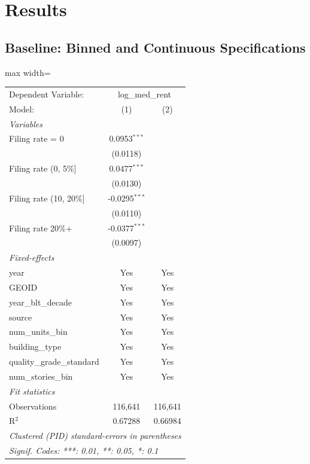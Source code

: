 \documentclass[
  11pt,
]{article}
\begin{document}
\section{Results}\label{results}

\subsection{Baseline: Binned and Continuous
Specifications}\label{baseline-binned-and-continuous-specifications}

\begin{adjustbox}{max width=\textwidth}
\begingroup
\centering
\begin{tabular}{lcc}
   \tabularnewline \midrule \midrule
   Dependent Variable: & \multicolumn{2}{c}{log\_med\_rent}\\
   Model:                     & (1)             & (2)\\  
   \midrule
   \emph{Variables}\\
   Filing rate = 0            & 0.0953$^{***}$  &   \\   
                              & (0.0118)        &   \\   
   Filing rate (0, 5\%]       & 0.0477$^{***}$  &   \\   
                              & (0.0130)        &   \\   
   Filing rate (10, 20\%]     & -0.0295$^{***}$ &   \\   
                              & (0.0110)        &   \\   
   Filing rate 20\%+          & -0.0377$^{***}$ &   \\   
                              & (0.0097)        &   \\   
   \midrule
   \emph{Fixed-effects}\\
   year                       & Yes             & Yes\\  
   GEOID                      & Yes             & Yes\\  
   year\_blt\_decade          & Yes             & Yes\\  
   source                     & Yes             & Yes\\  
   num\_units\_bin            & Yes             & Yes\\  
   building\_type             & Yes             & Yes\\  
   quality\_grade\_standard   & Yes             & Yes\\  
   num\_stories\_bin          & Yes             & Yes\\  
   \midrule
   \emph{Fit statistics}\\
   Observations               & 116,641         & 116,641\\  
   R$^2$                      & 0.67288         & 0.66984\\  
   \midrule \midrule
   \multicolumn{3}{l}{\emph{Clustered (PID) standard-errors in parentheses}}\\
   \multicolumn{3}{l}{\emph{Signif. Codes: ***: 0.01, **: 0.05, *: 0.1}}\\
\end{tabular}
\par\endgroup


\end{adjustbox}
\end{document}
